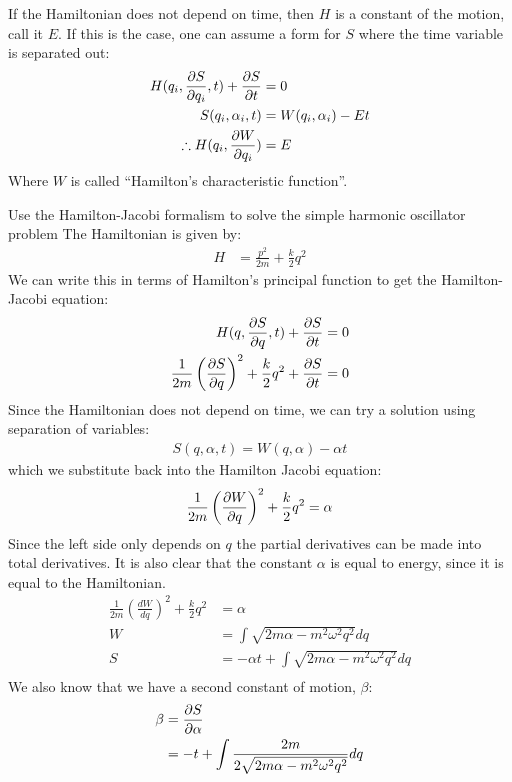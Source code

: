 If the Hamiltonian does not depend on time, then $H$ is a constant of the motion, call it $E$. If this is the case, one can assume a form for $S$ where the time variable is separated out:
\begin{align}
H(q_i,\frac{\partial S}{\partial q_i},t)+\frac{\partial S}{\partial t}&=0\nonumber\\
S(q_i,\alpha_i,t)&=W(q_i,\alpha_i)-Et\nonumber\\
\therefore H(q_i,\frac{\partial W}{\partial q_i})&=E
\end{align}
Where $W$ is called ``Hamilton's characteristic function''.

\begin{example}{0pt}{Use the Hamilton-Jacobi formalism to solve the simple harmonic oscillator problem}{}
The Hamiltonian is given by:
\begin{align*}
H&=\frac{p^2}{2m}+\frac{k}{2}q^2
\end{align*}
We can write this in terms of Hamilton's principal function to get the Hamilton-Jacobi equation:
\begin{align*}
H(q,\frac{\partial S}{\partial q},t)+\frac{\partial S}{\partial t}&=0\\
\frac{1}{2m}\left(\frac{\partial S}{\partial q}\right)^2+\frac{k}{2}q^2+\frac{\partial S}{\partial t}&=0
\end{align*}
Since the Hamiltonian does not depend on time, we can try a solution using separation of variables:
\begin{align*}
S(q,\alpha,t)=W(q,\alpha)-\alpha t
\end{align*}
which we substitute back into the Hamilton Jacobi equation:
\begin{align*}
\frac{1}{2m}\left(\frac{\partial W}{\partial q}\right)^2+\frac{k}{2}q^2=\alpha
\end{align*}
Since the left side only depends on $q$ the partial derivatives can be made into total derivatives. It is also clear that the constant $\alpha$ is equal to energy, since it is equal to the Hamiltonian.
\begin{align*}
\frac{1}{2m}\left(\frac{dW}{dq}\right)^2+\frac{k}{2}q^2&=\alpha\\
W&=\int \sqrt{2m\alpha-m^2\omega^2q^2}dq\\
S&=-\alpha t+\int \sqrt{2m\alpha-m^2\omega^2q^2}dq\\
\end{align*}
We also know that we have a second constant of motion, $\beta$:
\begin{align*}
\beta &=\die{S}{\alpha}\\
&=-t+\int \frac{2m}{2\sqrt{2m\alpha-m^2\omega^2q^2}}dq\\

\end{align*}
\end{example}
